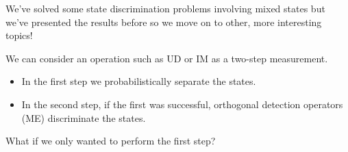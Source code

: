 \documentclass{beamer}
\begin{document}
\begin{frame}
We've solved some state discrimination problems involving mixed states but we've presented the results before so we move on to other,
more interesting topics!
\end{frame}

\begin{frame}
We can consider an operation such as UD or IM as a two-step measurement.  
\begin{itemize}
\item
In the first step we probabilistically separate the states.  
\item
In the second step, if the first was successful, orthogonal detection operators (ME) discriminate the states.
\end{itemize}
\[\]
What if we only wanted to perform the first step?
\end{frame}

\end{document}

